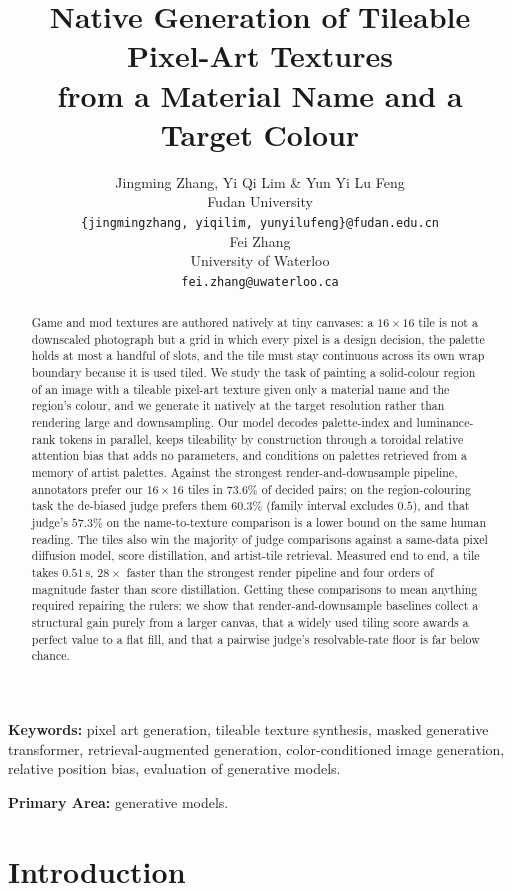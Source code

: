 \documentclass{article}
\title{Native Generation of Tileable Pixel-Art Textures \\
from a Material Name and a Target Colour}
\author{Jingming Zhang, Yi Qi Lim \& Yun Yi Lu Feng \\
Fudan University \\
\texttt{\{jingmingzhang, yiqilim, yunyilufeng\}@fudan.edu.cn} \\
\And
Fei Zhang \\
University of Waterloo \\
\texttt{fei.zhang@uwaterloo.ca}
}
\begin{document}
\maketitle

\begin{abstract}
Game and mod textures are authored natively at tiny canvases: a $16\times16$ tile is not a downscaled photograph but a grid in which every pixel is a design decision, the palette holds at most a handful of slots, and the tile must stay continuous across its own wrap boundary because it is used tiled. We study the task of painting a solid-colour region of an image with a tileable pixel-art texture given only a material name and the region's colour, and we generate it natively at the target resolution rather than rendering large and downsampling. Our model decodes palette-index and luminance-rank tokens in parallel, keeps tileability by construction through a toroidal relative attention bias that adds no parameters, and conditions on palettes retrieved from a memory of artist palettes. Against the strongest render-and-downsample pipeline, annotators prefer our $16\times16$ tiles in $73.6\%$ of decided pairs; on the region-colouring task the de-biased judge prefers them $60.3\%$ (family interval excludes $0.5$), and that judge's $57.3\%$ on the name-to-texture comparison is a lower bound on the same human reading. The tiles also win the majority of judge comparisons against a same-data pixel diffusion model, score distillation, and artist-tile retrieval. Measured end to end, a tile takes $0.51$\,s, $28\times$ faster than the strongest render pipeline and four orders of magnitude faster than score distillation. Getting these comparisons to mean anything required repairing the rulers: we show that render-and-downsample baselines collect a structural gain purely from a larger canvas, that a widely used tiling score awards a perfect value to a flat fill, and that a pairwise judge's resolvable-rate floor is far below chance.
\end{abstract}

\noindent\textbf{Keywords:}
pixel art generation, tileable texture synthesis, masked generative transformer, retrieval-augmented generation, color-conditioned image generation, relative position bias, evaluation of generative models.

\noindent\textbf{Primary Area:}
generative models.

\section{Introduction}
\label{sec:intro}
\end{document}
